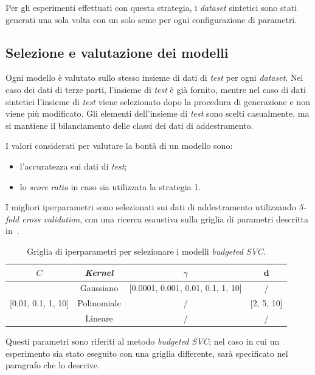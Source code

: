 Per gli esperimenti effettuati con questa strategia, i \emph{dataset} sintetici sono stati generati una sola volta con un solo seme per ogni configurazione di parametri.

\subsection{Selezione e valutazione dei modelli}
Ogni modello è valutato sullo stesso insieme di dati di \emph{test} per ogni \emph{dataset}.
Nel caso dei dati di terze parti, l'insieme di \emph{test} è già fornito, mentre nel caso di dati sintetici l'insieme di \emph{test} viene selezionato dopo la procedura di generazione e non viene più modificato.
Gli elementi dell'insieme di \emph{test} sono scelti casualmente, ma si mantiene il bilanciamento delle classi dei dati di addestramento.

I valori considerati per valutare la bontà di un modello sono:
\begin{itemize}
    \item l'accuratezza sui dati di \emph{test};
    \item lo \emph{score ratio} in caso sia utilizzata la strategia 1.
\end{itemize}

I migliori iperparametri sono selezionati sui dati di addestramento utilizzando \emph{5-fold cross validation}, con una ricerca esaustiva sulla griglia di parametri descritta in~.
\begin{table}
    \centering
    \begin{tabular}{cccc}
        \toprule
        $C$ & \emph{Kernel} & $\gamma$ & d \\
        \midrule
        \multirow{3}{*}{[0.01, 0.1, 1, 10]} & Gaussiano   & [0.0001, 0.001, 0.01, 0.1, 1, 10]   & /\\
                                            \cline{2-4}
                                            & Polinomiale   & / & [2, 5, 10] \\
                                            \cline{2-4}
                                            & Lineare       & / & / \\
        \bottomrule
    \end{tabular}
    \caption{Griglia di iperparametri per selezionare i modelli \emph{budgeted SVC}.}
    \label{tab:gridsearch_2d}
\end{table}
Questi parametri sono riferiti al metodo \emph{budgeted SVC}; nel caso in cui un esperimento sia stato eseguito con una griglia differente, sarà specificato nel paragrafo che lo descrive.

